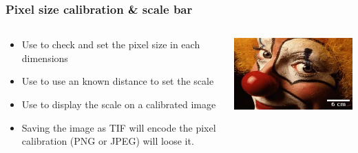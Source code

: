 \documentclass[ignorenonframetext,aspectratio=169,10pt,xcolor=table]{beamer}
\begin{document}
\begin{frame} \frametitle{Pixel size calibration \& scale bar}
  \begin{columns}
    \begin{column}{0.5\textwidth}
      \begin{itemize}
      \item Use  to check and set the
        pixel size in each dimensions
      \item Use  to use an known distance
        to set the scale
      \item Use  to display the scale on
        a calibrated image
      \item Saving the image as TIF will encode the pixel calibration (PNG or
        JPEG) will loose it.
      \end{itemize}
    \end{column}
    \begin{column}{0.5\textwidth}
      \includegraphics[width=\textwidth]{clown-scale}
    \end{column}
  \end{columns}
\end{frame}
\end{document}
